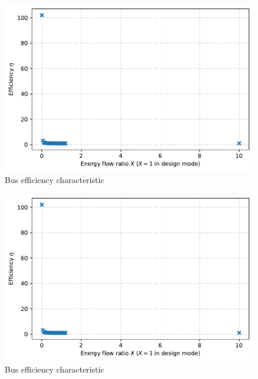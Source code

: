 \begin{minipage}{0.5\textwidth}
\begin{figure}[H]\begin{center}
\includegraphics[width=\textwidth]{figures/Bus_CharLine_compressordesign.pdf}
\caption{Bus efficiency characteristic}
\label{fig:Bus_CharLine_compressordesign}
\end{center}\end{figure}

\end{minipage}
\begin{minipage}{0.5\textwidth}
\begin{figure}[H]\begin{center}
\includegraphics[width=\textwidth]{figures/Bus_CharLine_pumpdesign.pdf}
\caption{Bus efficiency characteristic}
\label{fig:Bus_CharLine_pumpdesign}
\end{center}\end{figure}

\end{minipage}

